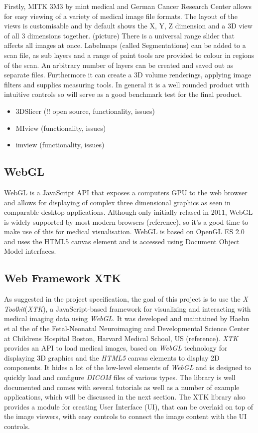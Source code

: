 \documentclass[a4paper,11pt,titlepage]{article}
\begin{document}
     Firstly, MITK 3M3 by mint medical and German Cancer Research Center allows for easy viewing of a variety of medical image file formats. The layout of the views is customisable and by default shows the X, Y, Z dimension and a 3D view of all 3 dimensions together. (picture) There is a universal range slider that affects all images at once. Labelmaps (called Segmentations) can be added to a scan file, as sub layers and a range of paint tools are provided to colour in regions of the scan. An arbitrary number of layers can be created and saved out as separate files. 
     Furthermore it can create a 3D volume renderings, applying image filters and supplies measuring tools. In general it is a well rounded product with intuitive controls so will serve as a good benchmark test for the final product.
\begin{itemize}
\item 3DSlicer (!! open source, functionality, issues)
\item MIview (functionality, issues)
\item imview (functionality, issues)
\end{itemize}


\subsection{WebGL}

WebGL is a JavaScript API that exposes a computers GPU to the web browser and allows for displaying of complex three dimensional graphics as seen in comparable desktop applications. Although only initially relased in 2011, WebGL is widely supported by most modern browsers (reference), so it's a good time to make use of this for medical visualisation. WebGL is based on OpenGL ES 2.0 and uses the HTML5 canvas element and is accessed using Document Object Model interfaces.

\subsection{Web Framework XTK}

As suggested in the project specification, the goal of this project is to use the \textit{X Toolkit}(\textit{XTK}), a JavaScript-based framework for visualizing and interacting with medical imaging data using \textit{WebGL}. It was developed and maintained by Haehn et al the of the Fetal-Neonatal Neuroimaging and Developmental Science Center at Childrens Hospital Boston, Harvard Medical School, US (reference). \textit{XTK} provides an API to load medical images, based on \textit{WebGL} technology for displaying 3D graphics and the \textit{HTML5} canvas elements to display 2D components. It hides a lot of the low-level elements of \textit{WebGL} and is designed to quickly load and configure \textit{DICOM} files of various types. The library is well documented and comes with several tutorials as well as a number of example applications, which will be discussed in the next section.
The XTK library also provides a module for creating User Interface (UI), that can be overlaid on top of the image viewers, with easy controls to connect the image content with the UI controls.
\end{document}
